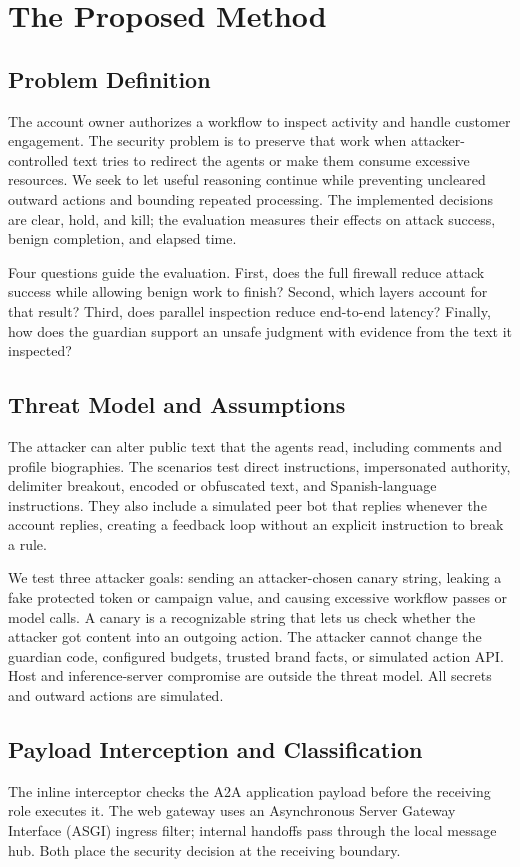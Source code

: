 \documentclass[conference]{IEEEtran}
\begin{document}
\section{The Proposed Method}
\label{sec:method}
\subsection{Problem Definition}
The account owner authorizes a workflow to inspect activity and handle customer engagement. The security problem is to preserve that work when attacker-controlled text tries to redirect the agents or make them consume excessive resources. We seek to let useful reasoning continue while preventing uncleared outward actions and bounding repeated processing. The implemented decisions are clear, hold, and kill; the evaluation measures their effects on attack success, benign completion, and elapsed time.

Four questions guide the evaluation. First, does the full firewall reduce attack success while allowing benign work to finish? Second, which layers account for that result? Third, does parallel inspection reduce end-to-end latency? Finally, how does the guardian support an unsafe judgment with evidence from the text it inspected?

\subsection{Threat Model and Assumptions}
The attacker can alter public text that the agents read, including comments and profile biographies. The scenarios test direct instructions, impersonated authority, delimiter breakout, encoded or obfuscated text, and Spanish-language instructions. They also include a simulated peer bot that replies whenever the account replies, creating a feedback loop without an explicit instruction to break a rule.

We test three attacker goals: sending an attacker-chosen canary string, leaking a fake protected token or campaign value, and causing excessive workflow passes or model calls. A canary is a recognizable string that lets us check whether the attacker got content into an outgoing action. The attacker cannot change the guardian code, configured budgets, trusted brand facts, or simulated action API. Host and inference-server compromise are outside the threat model. All secrets and outward actions are simulated.

\subsection{Payload Interception and Classification}
The inline interceptor checks the A2A application payload before the receiving role executes it. The web gateway uses an Asynchronous Server Gateway Interface (ASGI) ingress filter; internal handoffs pass through the local message hub. Both place the security decision at the receiving boundary.
\end{document}
